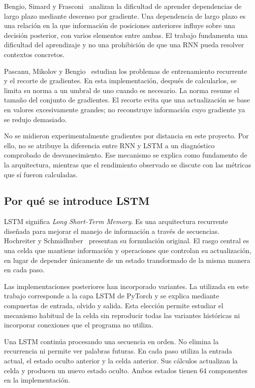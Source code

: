 Bengio, Simard y Frasconi~\cite{bengio1994} analizan la dificultad de aprender dependencias de largo plazo mediante descenso por gradiente. Una dependencia de largo plazo es una relación en la que información de posiciones anteriores influye sobre una decisión posterior, con varios elementos entre ambas. El trabajo fundamenta una dificultad del aprendizaje y no una prohibición de que una RNN pueda resolver contextos concretos.

Pascanu, Mikolov y Bengio~\cite{pascanu2013} estudian los problemas de entrenamiento recurrente y el recorte de gradientes. En esta implementación, después de calcularlos, se limita su norma a un umbral de uno cuando es necesario. La norma resume el tamaño del conjunto de gradientes. El recorte evita que una actualización se base en valores excesivamente grandes; no reconstruye información cuyo gradiente ya se redujo demasiado.

No se midieron experimentalmente gradientes por distancia en este proyecto. Por ello, no se atribuye la diferencia entre RNN y LSTM a un diagnóstico comprobado de desvanecimiento. Ese mecanismo se explica como fundamento de la arquitectura, mientras que el rendimiento observado se discute con las métricas que sí fueron calculadas.

\subsection{Por qué se introduce LSTM}
LSTM significa \emph{Long Short-Term Memory}. Es una arquitectura recurrente diseñada para mejorar el manejo de información a través de secuencias. Hochreiter y Schmidhuber~\cite{hochreiter1997} presentan su formulación original. El rasgo central es una celda que mantiene información y operaciones que controlan su actualización, en lugar de depender únicamente de un estado transformado de la misma manera en cada paso.

Las implementaciones posteriores han incorporado variantes. La utilizada en este trabajo corresponde a la capa LSTM de PyTorch y se explica mediante compuertas de entrada, olvido y salida. Esta elección permite estudiar el mecanismo habitual de la celda sin reproducir todas las variantes históricas ni incorporar conexiones que el programa no utiliza.

Una LSTM continúa procesando una secuencia en orden. No elimina la recurrencia ni permite ver palabras futuras. En cada paso utiliza la entrada actual, el estado oculto anterior y la celda anterior. Sus cálculos actualizan la celda y producen un nuevo estado oculto. Ambos estados tienen 64 componentes en la implementación.

